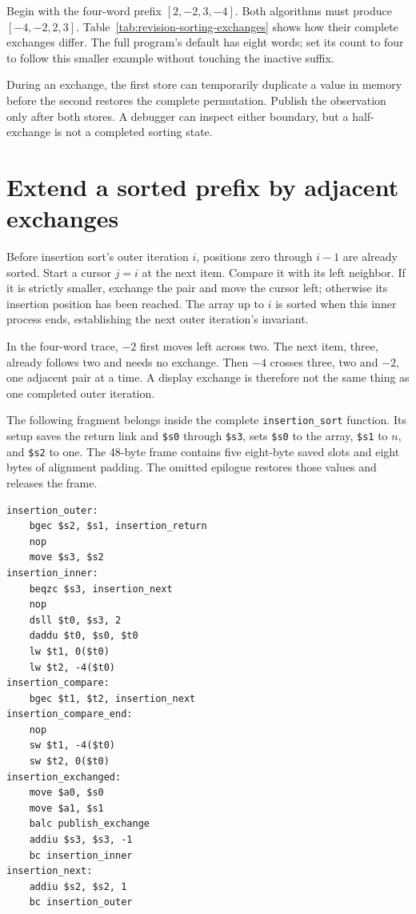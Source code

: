 Begin with the four-word prefix $[2,-2,3,-4]$. Both algorithms must produce
$[-4,-2,2,3]$. Table~\ref{tab:revision-sorting-exchanges} shows how their complete
exchanges differ. The full program's default has eight words; set its count to
four to follow this smaller example without touching the inactive suffix.



During an exchange, the first store can temporarily duplicate a value in memory
before the second restores the complete permutation. Publish the observation only
after both stores. A debugger can inspect either boundary, but a half-exchange is
not a completed sorting state.

\section{Extend a sorted prefix by adjacent exchanges}

Before insertion sort's outer iteration $i$, positions zero through $i-1$ are
already sorted. Start a cursor $j=i$ at the next item. Compare it with its left
neighbor. If it is strictly smaller, exchange the pair and move the cursor left;
otherwise its insertion position has been reached. The array up to $i$ is sorted
when this inner process ends, establishing the next outer iteration's invariant.

In the four-word trace, $-2$ first moves left across two. The next item, three,
already follows two and needs no exchange. Then $-4$ crosses three, two and $-2$,
one adjacent pair at a time. A display exchange is therefore not the same thing
as one completed outer iteration.

The following fragment belongs inside the complete \texttt{insertion\_sort}
function. Its setup saves the return link and \texttt{\$s0} through \texttt{\$s3},
sets \texttt{\$s0} to the array, \texttt{\$s1} to $n$, and \texttt{\$s2} to one.
The 48-byte frame contains five eight-byte saved slots and eight bytes of alignment
padding. The omitted epilogue restores those values and releases the frame.

\noindent\begin{minipage}{\linewidth}
  \begin{verbatim}
insertion_outer:
    bgec $s2, $s1, insertion_return
    nop
    move $s3, $s2
insertion_inner:
    beqzc $s3, insertion_next
    nop
    dsll $t0, $s3, 2
    daddu $t0, $s0, $t0
    lw $t1, 0($t0)
    lw $t2, -4($t0)
insertion_compare:
    bgec $t1, $t2, insertion_next
insertion_compare_end:
    nop
    sw $t1, -4($t0)
    sw $t2, 0($t0)
insertion_exchanged:
    move $a0, $s0
    move $a1, $s1
    balc publish_exchange
    addiu $s3, $s3, -1
    bc insertion_inner
insertion_next:
    addiu $s2, $s2, 1
    bc insertion_outer
\end{verbatim}
\end{minipage}

